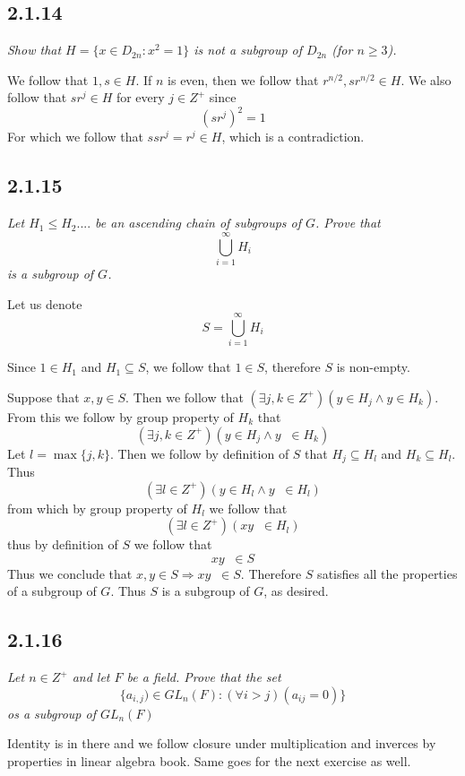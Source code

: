 \documentclass[11pt,oneside,titlepage]{book}
\DeclareMathOperator \inv {^{-1}}
\DeclareMathOperator \ra {\Rightarrow}
\begin{document}
\subsection*{2.1.14}

\textit{Show that $H = \{x \in D_{2n}: x^2 = 1\}$ is not a subgroup of $D_{2n}$ (for $n \geq 3$).}

We follow that $1, s  \in H$. If $n$ is even, then we follow that $r^{n/2},  sr^{n/2} \in H$.
We also follow that $sr^j \in H$ for every $j \in Z^+$ since
$$(sr^j)^2 =  1$$
For which we follow that $s sr^j = r^j \in H$, which is a contradiction.

\subsection*{2.1.15}

\textit{Let $H_1 \leq H_2 .... $ be an ascending chain of subgroups of $G$. Prove that
  $$\bigcup_{i = 1}^{\infty} H_i$$
  is a subgroup of $G$.}

Let us denote
$$S = \bigcup_{i = 1}^{\infty} H_i$$

Since $1 \in H_1$ and $H_1 \subseteq S$, we follow that $1 \in S$, therefore $S$ is non-empty.

Suppose that $x, y \in S$. Then we follow that $(\exists j, k \in Z^+)(y \in H_j \land y \in H_k)$.
From this we follow by group property of $H_k$ that
$$(\exists j, k \in Z^+)(y \in H_j \land y\inv \in H_k)$$
Let $l = \max\{j, k\}$. Then we follow by definition of $S$ that $H_j \subseteq H_l$
and $H_k \subseteq H_l$. Thus
$$(\exists l \in Z^+)(y \in H_l \land y\inv \in H_l)$$
from which by group property of $H_l$ we follow that
$$(\exists l \in Z^+)(xy\inv \in H_l)$$
thus by definition of $S$ we follow that
$$xy\inv \in S$$
Thus we conclude that $x, y \in S \ra xy\inv \in S$. Therefore $S$ satisfies all the
properties of a subgroup of $G$. Thus $S$ is a subgroup of $G$, as desired.

\subsection*{2.1.16}


\textit{Let $n \in Z^+$ and let $F$ be a field. Prove that the set
  $$\{a_{i, j}) \in GL_n(F): (\forall i > j )(a_{ij} = 0)\}$$
  os a subgroup of $GL_n(F)$}

Identity is in there and we follow closure under multiplication and inverces by properties
in linear algebra book. Same goes for the next exercise as well.
\end{document}
